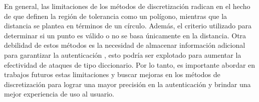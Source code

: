 En general, las limitaciones de los métodos de discretización radican en el hecho de que definen la región de tolerancia como un polígono, mientras que la distancia se plantea en términos de un círculo. Además, el criterio utilizado para determinar si un punto es válido o no se basa únicamente en la distancia. Otra debilidad de estos métodos es la necesidad de almacenar información adicional para garantizar la autenticación \cite{borrego2018debilidades}, esto podría ser explotado para aumentar la efectividad de ataques de tipo diccionario. Por lo tanto, es importante abordar en trabajos futuros estas limitaciones y buscar mejoras en los métodos de discretización para lograr una mayor precisión en la autenticación y brindar una mejor experiencia de uso al usuario.



